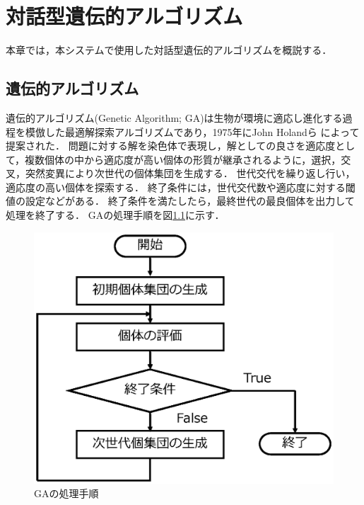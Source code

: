 \chapter{対話型遺伝的アルゴリズム}
本章では，本システムで使用した対話型遺伝的アルゴリズムを概説する．

\section{遺伝的アルゴリズム}
遺伝的アルゴリズム(Genetic Algorithm; GA)は生物が環境に適応し進化する過程を模倣した最適解探索アルゴリズムであり，1975年にJohn Holandら
\cite{Holland75}によって提案された．
問題に対する解を染色体で表現し，解としての良さを適応度として，複数個体の中から適応度が高い個体の形質が継承されるように，選択，交叉，突然変異により次世代の個体集団を生成する．
世代交代を繰り返し行い，適応度の高い個体を探索する．
終了条件には，世代交代数や適応度に対する閾値の設定などがある．
終了条件を満たしたら，最終世代の最良個体を出力して処理を終了する．
GAの処理手順を図\ref{ga_proces}に示す．

\begin{figure}[b!]
    \begin{center}
    \includegraphics[scale=0.62]{image/ga_proces.eps}
    \caption{GAの処理手順}
    \label{ga_proces}
    \end{center}
\end{figure}


